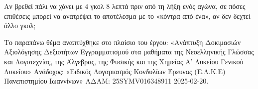 \begin{alist}
Αν βρεθεί πάλι να χάνει με $4$ γκολ $8$ λεπτά πριν από τη λήξη ενός αγώνα, σε πόσες επιθέσεις μπορεί να ανατρέψει το αποτέλεσμα με το «κόντρα από ένα», αν δεν δεχτεί άλλο γκολ;

{\footnotesize Το παραπάνω θέμα αναπτύχθηκε στο πλαίσιο του έργου: «Ανάπτυξη Δοκιμασιών Αξιολόγησης Δεξιοτήτων Εγγραμματισμού στα μαθήματα της Νεοελληνικής Γλώσσας και Λογοτεχνίας, της Άλγεβρας, της Φυσικής και της Χημείας Α' Λυκείου Γενικού Λυκείου» Ανάδοχος: «Ειδικός Λογαριασμός Κονδυλίων Έρευνας (Ε.Λ.Κ.Ε) Πανεπιστημίου Ιωαννίνων» ΑΔΑΜ: 25SYMV016348911 2025-02-20.}
\end{alist}

